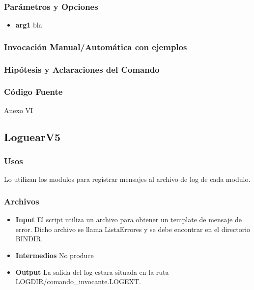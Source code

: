 \documentclass[a4paper,10pt,titlepage]{article}
\begin{document}
		\subsubsection{Par\'ametros y Opciones}
			\begin {itemize}
				\item \textbf{arg1} {bla}
			\end{itemize}
	
		\subsubsection{Invocaci\'on Manual/Autom\'atica con ejemplos}

		\subsubsection{Hip\'otesis y Aclaraciones del Comando}

		\subsubsection{C\'odigo Fuente}
			Anexo VI

	\subsection{LoguearV5}
		\subsubsection{Usos}

Lo utilizan los modulos para registrar mensajes al archivo de log de cada modulo.

		\subsubsection{Archivos}
			\begin {itemize}
				\item \textbf{Input} {El script utiliza un archivo para obtener un template de mensaje de error. Dicho archivo se llama ListaErrores y se debe encontrar en el directorio BINDIR.}
				\item \textbf{Intermedios} {No produce}
				\item \textbf{Output} {La salida del log estara situada en la ruta LOGDIR/comando\_invocante.LOGEXT.}
			\end{itemize}
\end{document}
